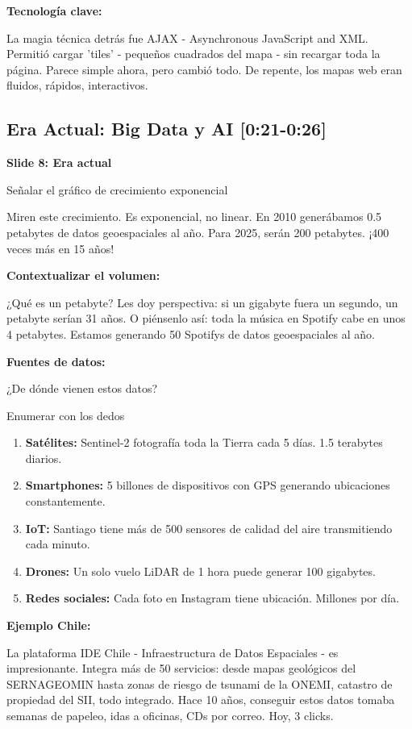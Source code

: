\documentclass[11pt,a4paper]{article}
\newcommand{\tiempo}[1]{\textcolor{timecolor}{\faIcon{clock} \textbf{[#1]}}}
\newcommand{\decir}[1]{\begin{tcolorbox}[colback=blue!5,colframe=usachblue,title={\faIcon{microphone} DECIR}]#1\end{tcolorbox}}
\newcommand{\hacer}[1]{\begin{tcolorbox}[colback=green!5,colframe=green!50!black,title={\faIcon{hand-point-right} HACER}]#1\end{tcolorbox}}
\begin{document}
\textbf{Tecnología clave:}

\decir{La magia técnica detrás fue AJAX - Asynchronous JavaScript and XML. Permitió cargar 'tiles' - pequeños cuadrados del mapa - sin recargar toda la página. Parece simple ahora, pero cambió todo. De repente, los mapas web eran fluidos, rápidos, interactivos.}

\subsection{Era Actual: Big Data y AI \tiempo{0:21-0:26}}

\textbf{Slide 8: Era actual}

\hacer{Señalar el gráfico de crecimiento exponencial}

\decir{Miren este crecimiento. Es exponencial, no linear. En 2010 generábamos 0.5 petabytes de datos geoespaciales al año. Para 2025, serán 200 petabytes. ¡400 veces más en 15 años!}

\textbf{Contextualizar el volumen:}

\decir{¿Qué es un petabyte? Les doy perspectiva: si un gigabyte fuera un segundo, un petabyte serían 31 años. O piénsenlo así: toda la música en Spotify cabe en unos 4 petabytes. Estamos generando 50 Spotifys de datos geoespaciales al año.}

\textbf{Fuentes de datos:}

\decir{¿De dónde vienen estos datos?}

\hacer{Enumerar con los dedos}

\decir{
\begin{enumerate}
    \item \textbf{Satélites:} Sentinel-2 fotografía toda la Tierra cada 5 días. 1.5 terabytes diarios.
    \item \textbf{Smartphones:} 5 billones de dispositivos con GPS generando ubicaciones constantemente.
    \item \textbf{IoT:} Santiago tiene más de 500 sensores de calidad del aire transmitiendo cada minuto.
    \item \textbf{Drones:} Un solo vuelo LiDAR de 1 hora puede generar 100 gigabytes.
    \item \textbf{Redes sociales:} Cada foto en Instagram tiene ubicación. Millones por día.
\end{enumerate}
}

\textbf{Ejemplo Chile:}

\decir{La plataforma IDE Chile - Infraestructura de Datos Espaciales - es impresionante. Integra más de 50 servicios: desde mapas geológicos del SERNAGEOMIN hasta zonas de riesgo de tsunami de la ONEMI, catastro de propiedad del SII, todo integrado. Hace 10 años, conseguir estos datos tomaba semanas de papeleo, idas a oficinas, CDs por correo. Hoy, 3 clicks.}
\end{document}
